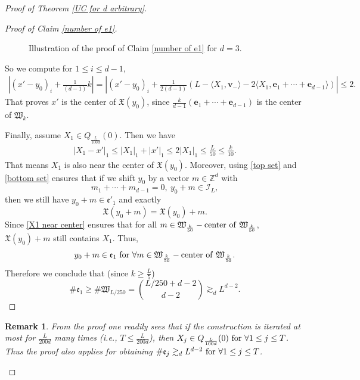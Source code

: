 \documentclass[11pt,reqno,UTF8,twoside]{amsart}
\newcommand{\Z}{\mathbb{Z}}
\newcommand{\bfv}{\mathbf{v}}
\newcommand{\bfe}{\mathbf{e}}
\newcommand{\mcI}{\mathcal{I}}
\newtheorem{rmk}{\bf Remark}[section]
\theoremstyle{definition}
\numberwithin{equation}{section}
\begin{document}
\begin{proof}[Proof of Theorem \ref{UC for d arbitrary}]
\begin{proof}[Proof of Claim \ref{number of e1}]
\begin{figure}[htbp]
\begin{tikzpicture}[x=0.75pt,y=0.75pt,yscale=-0.8,xscale=0.8]
\end{tikzpicture}

\caption{Illustration of the proof of Claim \ref{number of e1} for $d=3$.}
\label{choose the center}

  \end{figure}
  
  
  
  
  
  
  
  So we compute  for $1\leq i\leq d-1$,
  \begin{align*}
    \left|(x'-y_0)_i +\frac{1}{(d-1)}k  \right|= \left|(x'-y_0)_i + \frac{1}{2(d-1)}(L-\langle X_1 , \bfv_-\rangle-2  \langle X_1,\bfe_1+\cdots+\bfe_{d-1} \rangle  ) \right| \leq 2 .
  \end{align*} 
  That proves $x'$ is the center of $\mathfrak{X}(y_0)$, since $\frac{k}{d-1}(\bfe_1+\cdots +\bfe_{d-1})$ is the center of $\mathfrak{W}_k$.  


  Finally, assume $X_1\in Q_{\frac{L}{100d}}(0)$. Then we have 
  \begin{align}\label{X1 near center}
    |X_1-x'|_1\leq |X_1|_1+|x'|_1 \leq 2|X_1|_1\leq \frac{L}{50}\leq \frac{k}{10}. 
  \end{align} 
  That means $X_1$ is also near the center of $\mathfrak{X}(y_0)$. Moreover, using  \eqref{top set} and \eqref{bottom set}  ensures that if we shift $y_0$ by a vector $m\in \Z^d$ with 
  \[m_1+\cdots + m_{d-1}=0, \ y_0+m\in \mcI_L,\]
  then we still have $y_0+m\in \mathfrak{e}'_1$ and exactly 
  \[\mathfrak{X}(y_0+m)= \mathfrak{X}(y_0)+m.\]
  Since \eqref{X1 near center} ensures that for all $m\in \mathfrak{W}_\frac{k}{50}-{\rm center \ of \ } \mathfrak{W}_\frac{k}{50}$, $\mathfrak{X}(y_0)+m$ still contains $X_1$. Thus, 
  \[y_0 +m \in \mathfrak{e}_1\ {\rm for}\ \forall m\in \mathfrak{W}_{\frac{k}{50}}-{\rm center \ of \ } \mathfrak{W}_\frac{k}{50}. \]
  Therefore we conclude that (since $k\geq \frac{L}{5}$)
  \[\# \mathfrak{e}_1 \geq \# \mathfrak{W}_{L/250} = \binom{L/250+d-2}{d-2}\gtrsim_d L^{d-2}. \]





\end{proof}
\begin{rmk}\label{whole ej is d-2 dim}
 From the proof one readily sees that if the construction is iterated at most  for $\frac{L}{200d}$ many  times (i.e.,  $T\leq \frac{L}{200d}$), then $X_j \in Q_{\frac{L}{100d}}(0)\ {\rm for} \ \forall 1\leq j\leq T$. Thus the proof  also applies for obtaining  $\# \mathfrak{e}_j\gtrsim_d L^{d-2}\ {\rm for}\ \forall 1\leq j\leq T$.
\end{rmk}






\end{proof}
\end{document}

